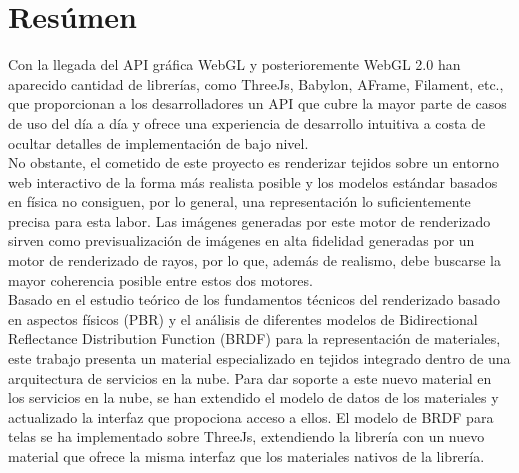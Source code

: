 \chapter{Res\'umen}

Con la llegada del API gr\'afica WebGL y posterioremente WebGL 2.0 han aparecido cantidad de librer\'ias, como ThreeJs, Babylon,
AFrame, Filament, etc.,  que proporcionan a los desarrolladores un API que cubre la mayor parte de casos de uso
del d\'ia a d\'ia y ofrece una experiencia de desarrollo intuitiva a costa de ocultar detalles de implementaci\'on de bajo nivel.\\

No obstante, el cometido de este proyecto es renderizar tejidos sobre un entorno web interactivo de la forma m\'as realista posible
y los modelos est\'andar basados en f\'isica no consiguen, por lo general, una representaci\'on lo suficientemente
precisa para esta labor. Las im\'agenes generadas por este motor de renderizado sirven como previsualizaci\'on de im\'agenes
en alta fidelidad generadas por un motor de renderizado de rayos, por lo que, adem\'as de realismo, debe buscarse la mayor
coherencia posible entre estos dos motores.\\


Basado en el estudio te\'orico de los fundamentos t\'ecnicos del renderizado basado en aspectos f\'isicos (PBR) y el an\'alisis
de diferentes modelos de Bidirectional Reflectance Distribution Function (BRDF) para la representaci\'on de materiales,
este trabajo presenta un material especializado en tejidos integrado dentro de una arquitectura de servicios en la nube.
Para dar soporte a este nuevo material en los servicios en la nube, se han extendido el modelo de datos de los materiales
y actualizado la interfaz que propociona acceso a ellos. El modelo de BRDF para telas se ha implementado sobre ThreeJs,
extendiendo la librer\'ia con un nuevo material que ofrece la misma interfaz que los materiales nativos de la librer\'ia.\\


